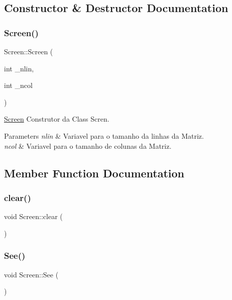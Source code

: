 \subsection{Constructor \& Destructor Documentation}
\mbox{\label{class_screen_a6c21beca43d25854d8674445127ef2eb}} 
\subsubsection{\texorpdfstring{Screen()}{Screen()}}
{\footnotesize\ttfamily Screen\+::\+Screen (\begin{DoxyParamCaption}\item[{int}]{\+\_\+nlin,  }\item[{int}]{\+\_\+ncol }\end{DoxyParamCaption})}



\mbox{\hyperlink{class_screen}{Screen}} Construtor da Class Scren. 


\begin{DoxyParams}{Parameters}
{\em nlin} & Variavel para o tamanho da linhas da Matriz. \\
\hline
{\em ncol} & Variavel para o tamanho de colunas da Matriz. \\
\hline
\end{DoxyParams}


\subsection{Member Function Documentation}
\mbox{\label{class_screen_a35e74266b2a04e37b354ceff7a5f1031}} 
\subsubsection{\texorpdfstring{clear()}{clear()}}
{\footnotesize\ttfamily void Screen\+::clear (\begin{DoxyParamCaption}{ }\end{DoxyParamCaption})}

\mbox{\label{class_screen_a4ba1818617bcf7a94a79ff8d85b847b8}} 
\subsubsection{\texorpdfstring{See()}{See()}}
{\footnotesize\ttfamily void Screen\+::\+See (\begin{DoxyParamCaption}{ }\end{DoxyParamCaption})}

